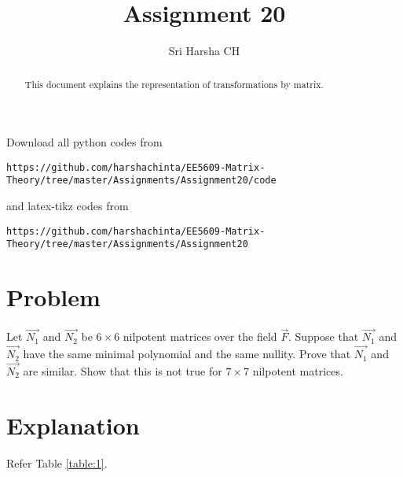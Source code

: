 \documentclass[journal,12pt,twocolumn]{IEEEtran}
\begin{document}
\renewcommand{\thefigure}{\theproblem}

\def\putbox#1#2#3{\makebox[0in][l]{\makebox[#1][l]{}\raisebox{\baselineskip}[0in][0in]{\raisebox{#2}[0in][0in]{#3}}}}
     \def\rightbox#1{\makebox[0in][r]{#1}}
     \def\centbox#1{\makebox[0in]{#1}}
     \def\topbox#1{\raisebox{-\baselineskip}[0in][0in]{#1}}
     \def\midbox#1{\raisebox{-0.5\baselineskip}[0in][0in]{#1}}
\vspace{3cm}
\title{Assignment 20}
\author{Sri Harsha CH}

\maketitle
\newpage

\bigskip
\renewcommand{\thefigure}{\theenumi}
\renewcommand{\thetable}{\theenumi}

\begin{abstract}
This document explains the representation of transformations by matrix.
\end{abstract}

Download all python codes from 
\begin{lstlisting}
https://github.com/harshachinta/EE5609-Matrix-Theory/tree/master/Assignments/Assignment20/code
\end{lstlisting}
%
and latex-tikz codes from 
%
\begin{lstlisting}
https://github.com/harshachinta/EE5609-Matrix-Theory/tree/master/Assignments/Assignment20
\end{lstlisting}
%
\section{Problem}
Let $\vec{N_1}$ and $\vec{N_2}$ be $6 \times 6$ nilpotent matrices over the field $\vec{F}$. Suppose that $\vec{N_1}$ and $\vec{N_2}$ have the same minimal polynomial and the same nullity. Prove that $\vec{N_1}$ and $\vec{N_2}$ are similar. Show that this is not true for $7 \times 7$ nilpotent matrices.

\section{Explanation}
Refer Table \ref{table:1}.
\end{document}
